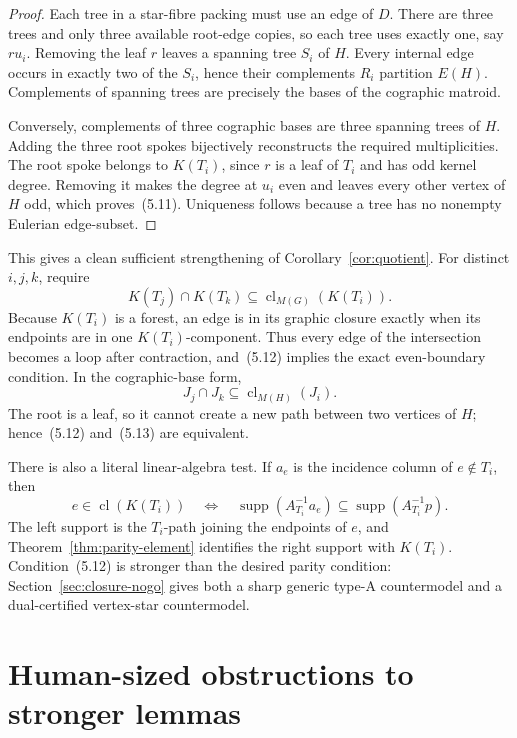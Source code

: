 \documentclass[11pt]{article}
\theoremstyle{definition}
\theoremstyle{remark}
\newcommand{\supp}{\operatorname{supp}}
\newcommand{\1}{\mathbf 1}
\begin{document}
\begin{proof}
Each tree in a star-fibre packing must use an edge of \(D\).  There are
three trees and only three available root-edge copies, so each tree uses
exactly one, say \(ru_i\).  Removing the leaf \(r\) leaves a spanning tree
\(S_i\) of \(H\).  Every internal edge occurs in exactly two of the
\(S_i\), hence their complements \(R_i\) partition \(E(H)\).  Complements
of spanning trees are precisely the bases of the cographic matroid.

Conversely, complements of three cographic bases are three spanning trees
of \(H\).  Adding the three root spokes bijectively reconstructs the
required multiplicities.  The root spoke belongs to \(K(T_i)\), since
\(r\) is a leaf of \(T_i\) and has odd kernel degree.  Removing it makes
the degree at \(u_i\) even and leaves every other vertex of \(H\) odd,
which proves~(5.11).  Uniqueness follows because a tree has no nonempty
Eulerian edge-subset.
\end{proof}

This gives a clean sufficient strengthening of
Corollary~\ref{cor:quotient}.  For distinct \(i,j,k\), require
\[
 K(T_j)\cap K(T_k)
       \subseteq\operatorname{cl}_{M(G)}(K(T_i)).        \tag{5.12}
\]
Because \(K(T_i)\) is a forest, an edge is in its graphic closure exactly
when its endpoints are in one \(K(T_i)\)-component.  Thus every edge of
the intersection becomes a loop after contraction, and~(5.12) implies
the exact even-boundary condition.  In the cographic-base form,
\[
 J_j\cap J_k\subseteq\operatorname{cl}_{M(H)}(J_i).      \tag{5.13}
\]
The root is a leaf, so it cannot create a new path between two vertices of
\(H\); hence~(5.12) and~(5.13) are equivalent.

There is also a literal linear-algebra test.  If \(a_e\) is the incidence
column of \(e\notin T_i\), then
\[
 e\in\operatorname{cl}(K(T_i))
 \quad\Longleftrightarrow\quad
 \supp(A_{T_i}^{-1}a_e)
 \subseteq\supp(A_{T_i}^{-1}p).                          \tag{5.14}
\]
The left support is the \(T_i\)-path joining the endpoints of \(e\), and
Theorem~\ref{thm:parity-element} identifies the right support with
\(K(T_i)\).  Condition~(5.12) is stronger than the desired parity
condition: Section~\ref{sec:closure-nogo} gives both a sharp generic
type-A countermodel and a dual-certified vertex-star countermodel.

\section{Human-sized obstructions to stronger lemmas}
\end{document}

